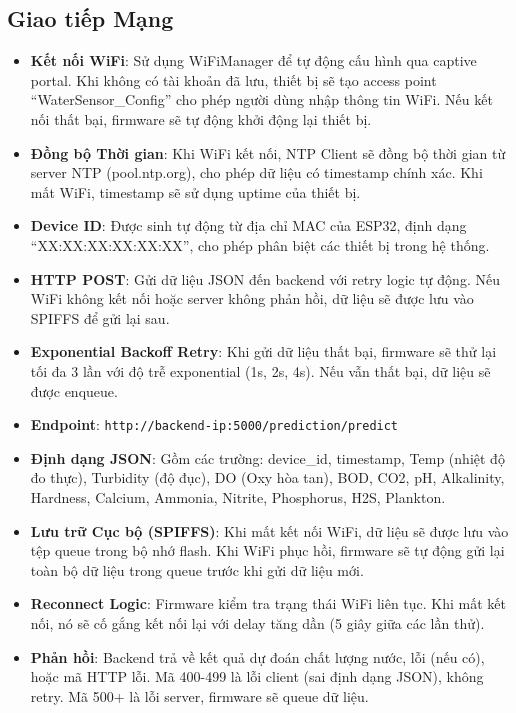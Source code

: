 \subsection{Giao tiếp Mạng}
\begin{itemize}
    \item \textbf{Kết nối WiFi}: Sử dụng WiFiManager để tự động cấu hình qua captive portal. Khi không có tài khoản đã lưu, thiết bị sẽ tạo access point ``WaterSensor\_Config'' cho phép người dùng nhập thông tin WiFi. Nếu kết nối thất bại, firmware sẽ tự động khởi động lại thiết bị.
    
    \item \textbf{Đồng bộ Thời gian}: Khi WiFi kết nối, NTP Client sẽ đồng bộ thời gian từ server NTP (pool.ntp.org), cho phép dữ liệu có timestamp chính xác. Khi mất WiFi, timestamp sẽ sử dụng uptime của thiết bị.
    
    \item \textbf{Device ID}: Được sinh tự động từ địa chỉ MAC của ESP32, định dạng ``XX:XX:XX:XX:XX:XX'', cho phép phân biệt các thiết bị trong hệ thống.
    
    \item \textbf{HTTP POST}: Gửi dữ liệu JSON đến backend với retry logic tự động. Nếu WiFi không kết nối hoặc server không phản hồi, dữ liệu sẽ được lưu vào SPIFFS để gửi lại sau.
    
    \item \textbf{Exponential Backoff Retry}: Khi gửi dữ liệu thất bại, firmware sẽ thử lại tối đa 3 lần với độ trễ exponential (1s, 2s, 4s). Nếu vẫn thất bại, dữ liệu sẽ được enqueue.
    
    \item \textbf{Endpoint}: \texttt{http://backend-ip:5000/prediction/predict}
    
    \item \textbf{Định dạng JSON}: Gồm các trường: device\_id, timestamp, Temp (nhiệt độ đo thực), Turbidity (độ đục), DO (Oxy hòa tan), BOD, CO2, pH, Alkalinity, Hardness, Calcium, Ammonia, Nitrite, Phosphorus, H2S, Plankton.
    
    \item \textbf{Lưu trữ Cục bộ (SPIFFS)}: Khi mất kết nối WiFi, dữ liệu sẽ được lưu vào tệp queue trong bộ nhớ flash. Khi WiFi phục hồi, firmware sẽ tự động gửi lại toàn bộ dữ liệu trong queue trước khi gửi dữ liệu mới.
    
    \item \textbf{Reconnect Logic}: Firmware kiểm tra trạng thái WiFi liên tục. Khi mất kết nối, nó sẽ cố gắng kết nối lại với delay tăng dần (5 giây giữa các lần thử).
    
    \item \textbf{Phản hồi}: Backend trả về kết quả dự đoán chất lượng nước, lỗi (nếu có), hoặc mã HTTP lỗi. Mã 400-499 là lỗi client (sai định dạng JSON), không retry. Mã 500+ là lỗi server, firmware sẽ queue dữ liệu.
\end{itemize}

